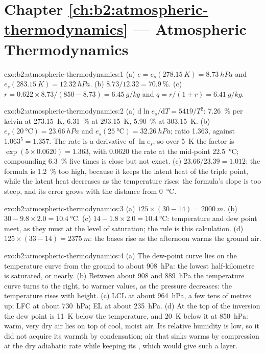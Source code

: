 \section*{Chapter \ref{ch:b2:atmospheric-thermodynamics} --- Atmospheric Thermodynamics}

\begin{solution}{exo:b2:atmospheric-thermodynamics:1}
(a) $e = e_s(\qty{278.15}{K}) = \qty{8.73}{hPa}$ and $e_s(\qty{283.15}{K}) = \qty{12.32}{hPa}$.
(b) $8.73/12.32 = \qty{70.9}{\percent}$. (c) $r = 0.622 \times 8.73/(850 - 8.73) =
\qty{6.45}{g/kg}$ and $q = r/(1 + r) = \qty{6.41}{g/kg}$.
\end{solution}

\begin{solution}{exo:b2:atmospheric-thermodynamics:2}
(a) $\mathrm{d}\ln e_s/\mathrm{d}T = 5419/T^2$: \qty{7.26}{\percent} per kelvin at
\qty{273.15}{K}, \qty{6.31}{\percent} at \qty{293.15}{K}, \qty{5.90}{\percent} at
\qty{303.15}{K}. (b) $e_s(\qty{20}{\celsius}) = \qty{23.66}{hPa}$ and $e_s(\qty{25}{\celsius})
= \qty{32.26}{hPa}$; ratio 1.363, against $1.063^5 = 1.357$. The rate is a derivative of
$\ln e_s$, so over \qty{5}{K} the factor is $\exp(5 \times 0.0620) = 1.363$, with 0.0620 the
rate at the mid-point \qty{22.5}{\celsius}; compounding \qty{6.3}{\percent} five times is close
but not exact. (c) $23.66/23.39 = 1.012$: the formula is \qty{1.2}{\percent} too high, because
it keeps the latent heat of the triple point, while the latent heat decreases as the temperature
rises; the formula's slope is too steep, and its error grows with the distance from
\qty{0}{\celsius}.
\end{solution}

\begin{solution}{exo:b2:atmospheric-thermodynamics:3}
(a) $125 \times (30 - 14) = \qty{2000}{m}$. (b) $30 - 9.8 \times 2.0 = \qty{10.4}{\celsius}$.
(c) $14 - 1.8 \times 2.0 = \qty{10.4}{\celsius}$: temperature and dew point meet, as they must at
the level of saturation; the rule is this calculation. (d) $125 \times (33 - 14) = \qty{2375}{m}$:
the bases rise as the afternoon warms the ground air.
\end{solution}

\begin{solution}{exo:b2:atmospheric-thermodynamics:4}
(a) The dew-point curve lies on the temperature curve from the ground to about \qty{908}{hPa}:
the lowest half-kilometre is saturated, or nearly. (b) Between about 908 and \qty{889}{hPa}
the temperature curve turns to the right, to warmer values, as the pressure decreases: the
temperature rises with height. (c) LCL at about \qty{964}{hPa}, a few tens of metres up; LFC at
about \qty{730}{hPa}; EL at about \qty{235}{hPa}. (d) At the top of the inversion the dew point
is \qty{11}{K} below the temperature, and \qty{20}{K} below it at \qty{850}{hPa}: warm, very dry
air lies on top of cool, moist air. Its relative humidity is low, so it did not acquire its
warmth by condensation; air that sinks warms by compression at the dry adiabatic rate while
keeping its , which would give such a layer.
\end{solution}


